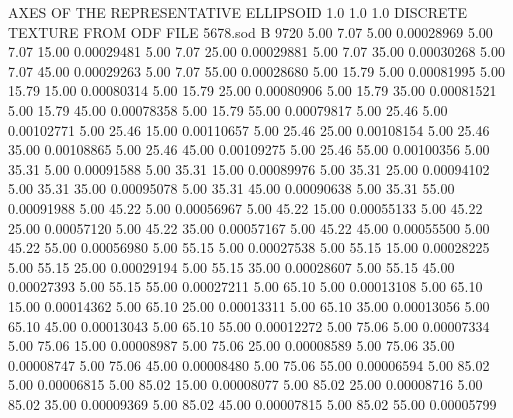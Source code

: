 AXES OF THE REPRESENTATIVE ELLIPSOID
   1.0   1.0   1.0
DISCRETE TEXTURE FROM ODF FILE  5678.sod                                
B    9720
      5.00      7.07      5.00     0.00028969
      5.00      7.07     15.00     0.00029481
      5.00      7.07     25.00     0.00029881
      5.00      7.07     35.00     0.00030268
      5.00      7.07     45.00     0.00029263
      5.00      7.07     55.00     0.00028680
      5.00     15.79      5.00     0.00081995
      5.00     15.79     15.00     0.00080314
      5.00     15.79     25.00     0.00080906
      5.00     15.79     35.00     0.00081521
      5.00     15.79     45.00     0.00078358
      5.00     15.79     55.00     0.00079817
      5.00     25.46      5.00     0.00102771
      5.00     25.46     15.00     0.00110657
      5.00     25.46     25.00     0.00108154
      5.00     25.46     35.00     0.00108865
      5.00     25.46     45.00     0.00109275
      5.00     25.46     55.00     0.00100356
      5.00     35.31      5.00     0.00091588
      5.00     35.31     15.00     0.00089976
      5.00     35.31     25.00     0.00094102
      5.00     35.31     35.00     0.00095078
      5.00     35.31     45.00     0.00090638
      5.00     35.31     55.00     0.00091988
      5.00     45.22      5.00     0.00056967
      5.00     45.22     15.00     0.00055133
      5.00     45.22     25.00     0.00057120
      5.00     45.22     35.00     0.00057167
      5.00     45.22     45.00     0.00055500
      5.00     45.22     55.00     0.00056980
      5.00     55.15      5.00     0.00027538
      5.00     55.15     15.00     0.00028225
      5.00     55.15     25.00     0.00029194
      5.00     55.15     35.00     0.00028607
      5.00     55.15     45.00     0.00027393
      5.00     55.15     55.00     0.00027211
      5.00     65.10      5.00     0.00013108
      5.00     65.10     15.00     0.00014362
      5.00     65.10     25.00     0.00013311
      5.00     65.10     35.00     0.00013056
      5.00     65.10     45.00     0.00013043
      5.00     65.10     55.00     0.00012272
      5.00     75.06      5.00     0.00007334
      5.00     75.06     15.00     0.00008987
      5.00     75.06     25.00     0.00008589
      5.00     75.06     35.00     0.00008747
      5.00     75.06     45.00     0.00008480
      5.00     75.06     55.00     0.00006594
      5.00     85.02      5.00     0.00006815
      5.00     85.02     15.00     0.00008077
      5.00     85.02     25.00     0.00008716
      5.00     85.02     35.00     0.00009369
      5.00     85.02     45.00     0.00007815
      5.00     85.02     55.00     0.00005799
